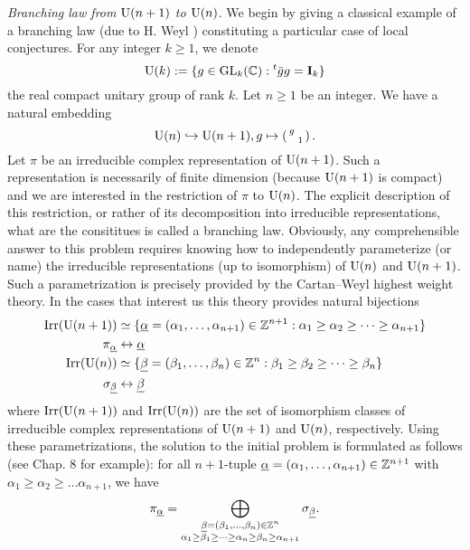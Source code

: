 \emph{Branching law from $\mathrm{U}(n+1)$ to $\mathrm{U}(n)$}.
We begin by giving a classical example of a branching law (due to H. Weyl \cite{weyl1946classical}) constituting a particular case of local conjectures.
For any integer $k\geq 1$, we denote
\[
    \mathrm{U}(k) := \{g \in \mathrm{GL}_k(\mathbb{C}) : {}^t \bar{g} g = \mathbf{I}_k \}
\]
the real compact unitary group of rank $k$.
Let $n \geq 1$ be an integer.
We have a natural embedding
\[
    \mathrm{U}(n) \hookrightarrow \mathrm{U}(n+1), g \mapsto \left(\begin{smallmatrix}  g & \\ & 1 \end{smallmatrix}\right).
\]
Let $\pi$ be an irreducible complex representation of $\mathrm{U}(n+1)$. Such a representation is necessarily of finite dimension (because $\mathrm{U}(n+1)$ is compact) and we are interested in the restriction of $\pi$ to $\mathrm{U}(n)$.
The explicit description of this restriction, or rather of its decomposition into irreducible representations, what are the consititues is called a branching law.
Obviously, any comprehensible answer to this problem requires knowing how to independently parameterize (or name) the irreducible representations (up to isomorphism) of $\mathrm{U}(n)$ and $\mathrm{U}(n+1)$.
Such a parametrization is precisely provided by the Cartan--Weyl highest weight theory.
In the cases that interest us this theory provides natural bijections
\begin{align*}
    \mathrm{Irr}(\mathrm{U}(n+1)) &\simeq \{ \underline{\alpha} = (\alpha_1, \dots, \alpha_{n+1}) \in \mathbb{Z}^{n+1}: \alpha_1 \geq \alpha_2 \geq \dots \geq \alpha_{n+1} \} \\
    \pi_{\underline{\alpha}} &\leftrightarrow \underline{\alpha} \\
    \mathrm{Irr}(\mathrm{U}(n)) & \simeq \{ \underline{\beta} = (\beta_1, \dots, \beta_n) \in \mathbb{Z}^{n}: \beta_1 \geq \beta_2 \geq \dots \geq \beta_n \} \\
    \sigma_{\underline{\beta}} &\leftrightarrow \underline{\beta}
\end{align*}
where $\mathrm{Irr}(\mathrm{U}(n+1))$ and $\mathrm{Irr}(\mathrm{U}(n))$ are the set of isomorphism classes of irreducible complex representations of $\mathrm{U}(n+1)$ and $\mathrm{U}(n)$, respectively.
Using these parametrizations, the solution to the initial problem is formulated as follows (see \cite{goodman2009symmetry} Chap. 8 for
example):
for all $n+1$-tuple $\underline{\alpha} = (\alpha_1, \dots, \alpha_{n+1}) \in \mathbb{Z}^{n+1}$ with $\alpha_1 \geq \alpha_2 \geq \dots \alpha_{n+1}$, we have
\[
    \pi_{\underline{\alpha}} = \bigoplus_{\substack{\underline{\beta}  = (\beta_1, \dots, \beta_n)\in \mathbb{Z}^{n} \\ \alpha_1 \geq \beta_1 \geq \dots \geq \alpha_n \geq \beta_n \geq \alpha_{n+1}}} \sigma_{\underline{\beta}}.
\]
